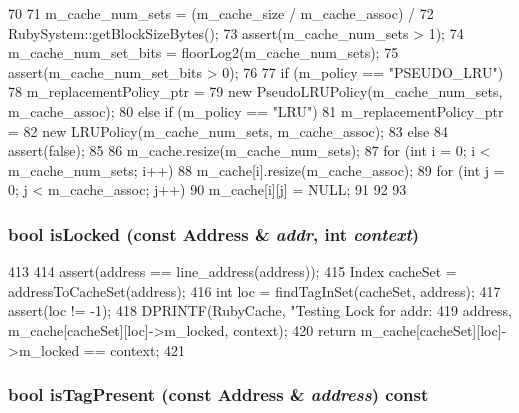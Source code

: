 \begin{DoxyCode}
70 {
71     m_cache_num_sets = (m_cache_size / m_cache_assoc) /
72         RubySystem::getBlockSizeBytes();
73     assert(m_cache_num_sets > 1);
74     m_cache_num_set_bits = floorLog2(m_cache_num_sets);
75     assert(m_cache_num_set_bits > 0);
76 
77     if (m_policy == "PSEUDO_LRU")
78         m_replacementPolicy_ptr =
79             new PseudoLRUPolicy(m_cache_num_sets, m_cache_assoc);
80     else if (m_policy == "LRU")
81         m_replacementPolicy_ptr =
82             new LRUPolicy(m_cache_num_sets, m_cache_assoc);
83     else
84         assert(false);
85 
86     m_cache.resize(m_cache_num_sets);
87     for (int i = 0; i < m_cache_num_sets; i++) {
88         m_cache[i].resize(m_cache_assoc);
89         for (int j = 0; j < m_cache_assoc; j++) {
90             m_cache[i][j] = NULL;
91         }
92     }
93 }
\end{DoxyCode}
\hypertarget{classCacheMemory_aeb3a7f627af8ca6e8c5f9a878a01ea6f}{
\subsubsection[{isLocked}]{\setlength{\rightskip}{0pt plus 5cm}bool isLocked (const {\bf Address} \& {\em addr}, \/  int {\em context})}}
\label{classCacheMemory_aeb3a7f627af8ca6e8c5f9a878a01ea6f}



\begin{DoxyCode}
413 {
414     assert(address == line_address(address));
415     Index cacheSet = addressToCacheSet(address);
416     int loc = findTagInSet(cacheSet, address);
417     assert(loc != -1);
418     DPRINTF(RubyCache, "Testing Lock for addr: %
419             address, m_cache[cacheSet][loc]->m_locked, context);
420     return m_cache[cacheSet][loc]->m_locked == context;
421 }
\end{DoxyCode}
\hypertarget{classCacheMemory_a38231bf6d0b58d2b0319faa5af3135ca}{
\subsubsection[{isTagPresent}]{\setlength{\rightskip}{0pt plus 5cm}bool isTagPresent (const {\bf Address} \& {\em address}) const}}
\label{classCacheMemory_a38231bf6d0b58d2b0319faa5af3135ca}



